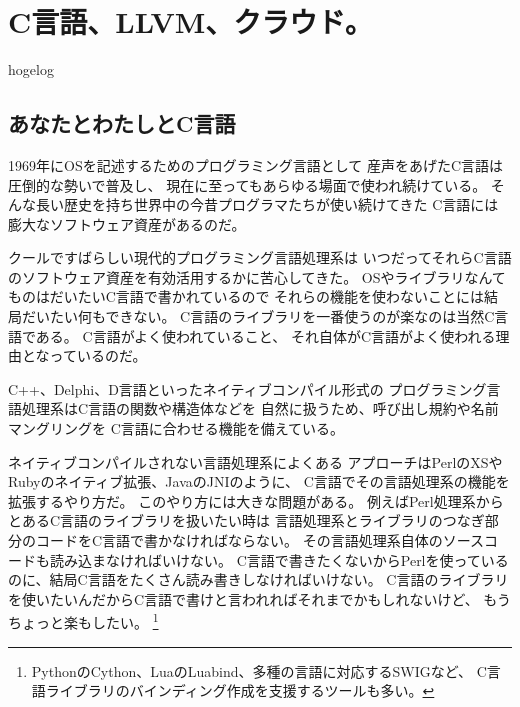 
\chapter{C言語、LLVM、クラウド。}

\begin{flushright}
 {\headfont hogelog}
\end{flushright}

\section{あなたとわたしとC言語}
1969年にOSを記述するためのプログラミング言語として
産声をあげたC言語は圧倒的な勢いで普及し、
現在に至ってもあらゆる場面で使われ続けている。
そんな長い歴史を持ち世界中の今昔プログラマたちが使い続けてきた
C言語には膨大なソフトウェア資産があるのだ。

クールですばらしい現代的プログラミング言語処理系は
いつだってそれらC言語のソフトウェア資産を有効活用するかに苦心してきた。
OSやライブラリなんてものはだいたいC言語で書かれているので
それらの機能を使わないことには結局だいたい何もできない。
C言語のライブラリを一番使うのが楽なのは当然C言語である。
C言語がよく使われていること、
それ自体がC言語がよく使われる理由となっているのだ。

C++、Delphi、D言語といったネイティブコンパイル形式の
プログラミング言語処理系はC言語の関数や構造体などを
自然に扱うため、呼び出し規約や名前マングリングを
C言語に合わせる機能を備えている。

ネイティブコンパイルされない言語処理系によくある
アプローチはPerlのXSやRubyのネイティブ拡張、JavaのJNIのように、
C言語でその言語処理系の機能を拡張するやり方だ。
このやり方には大きな問題がある。
例えばPerl処理系からとあるC言語のライブラリを扱いたい時は
言語処理系とライブラリのつなぎ部分のコードをC言語で書かなければならない。
その言語処理系自体のソースコードも読み込まなければいけない。
C言語で書きたくないからPerlを使っているのに、結局C言語をたくさん読み書きしなければいけない。
C言語のライブラリを使いたいんだからC言語で書けと言われればそれまでかもしれないけど、
もうちょっと楽もしたい。
\footnote{
PythonのCython、LuaのLuabind、多種の言語に対応するSWIGなど、
C言語ライブラリのバインディング作成を支援するツールも多い。}

